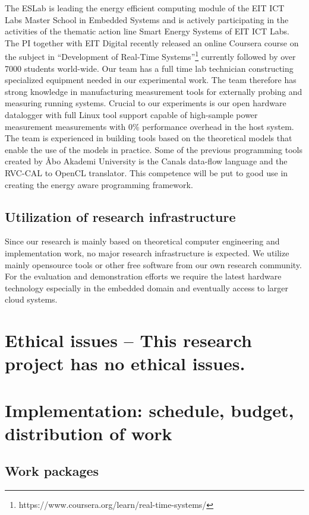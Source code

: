 \documentclass{article}
\begin{document}
The ESLab is leading the energy efficient computing module of the EIT ICT Labs Master School in Embedded Systems and is actively participating in the activities of the thematic action line Smart Energy Systems of EIT ICT Labs.
The PI together with EIT Digital recently released an online Coursera course on the subject in ``Development of Real-Time Systems''\footnote{https://www.coursera.org/learn/real-time-systems/} currently followed by over 7000 students world-wide.
Our team has a full time lab technician constructing specialized equipment needed in our experimental work. 
The team therefore has strong knowledge in manufacturing measurement tools for externally probing and measuring running systems. 
Crucial to our experiments is our open hardware datalogger with full Linux tool support capable of high-sample power measurement measurements with 0\% performance overhead in the host system. 
The team is experienced in building tools based on the theoretical models that enable the use of the models in practice. 
Some of the previous programming tools created by \AA{}bo Akademi University is the Canals data-flow language and the RVC-CAL to OpenCL translator. 
This competence will be put to good use in creating the energy aware programming framework.

\subsection{Utilization of research infrastructure}
Since our research is mainly based on theoretical computer engineering and implementation work, no major research infrastructure is expected.
We utilize mainly opensource tools or other free software from our own research community.
For the evaluation and demonstration efforts we require the latest hardware technology especially in the embedded domain and eventually access to larger cloud systems.

\section{Ethical issues \small -- This research project has no ethical issues. }

\section{Implementation: schedule, budget, distribution of work}
\subsection{Work packages}
\end{document}
